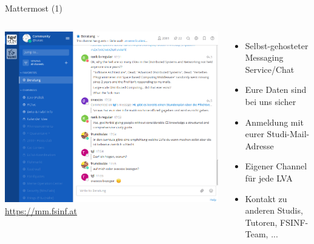\documentclass{beamer}
\begin{document}
\begin{frame}{Mattermost (1)}
  \begin{columns}
      \centering
      \includegraphics[width=\textwidth]{mattermost.png}
      \url{https://mm.fsinf.at}
      \begin{itemize}
        \item Selbst-gehosteter Messaging Service/Chat
        \item Eure Daten sind bei uns sicher
        \item Anmeldung mit eurer Studi-Mail-Adresse
        \item Eigener Channel für jede LVA
        \item Kontakt zu anderen Studis, Tutoren, FSINF-Team, ...
      \end{itemize}
  \end{columns}
\end{frame}
\end{document}
